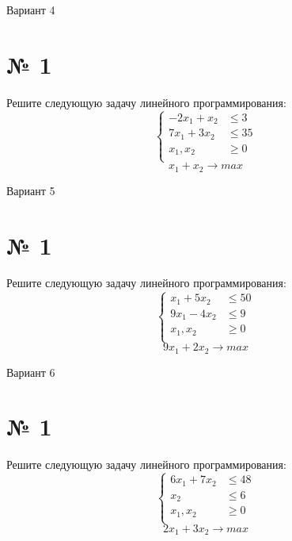 \documentclass{article}%
\begin{document}
%
\newpage%
\begin{center}%
\begin{Huge}%
Вариант 4%
\end{Huge}%
\end{center}%
\section*{№ 1}%
\label{sec:1}%
Решите следующую задачу линейного программирования: %
\[%
\left\{\begin{aligned}-2x_{1}+x_{2} & \le3 \\7x_{1}+3x_{2} & \le35 \\x_{1},x_{2} & \ge 0 \\\end{aligned}\right.%
\]%
\[%
x_{1}+x_{2}  \to max%
\]

%
\newpage%
\begin{center}%
\begin{Huge}%
Вариант 5%
\end{Huge}%
\end{center}%
\section*{№ 1}%
\label{sec:1}%
Решите следующую задачу линейного программирования: %
\[%
\left\{\begin{aligned}x_{1}+5x_{2} & \le50 \\9x_{1}-4x_{2} & \le9 \\x_{1},x_{2} & \ge 0 \\\end{aligned}\right.%
\]%
\[%
9x_{1}+2x_{2}  \to max%
\]

%
\newpage%
\begin{center}%
\begin{Huge}%
Вариант 6%
\end{Huge}%
\end{center}%
\section*{№ 1}%
\label{sec:1}%
Решите следующую задачу линейного программирования: %
\[%
\left\{\begin{aligned}6x_{1}+7x_{2} & \le48 \\x_{2} & \le6 \\x_{1},x_{2} & \ge 0 \\\end{aligned}\right.%
\]%
\[%
2x_{1}+3x_{2}  \to max%
\]
\end{document}
